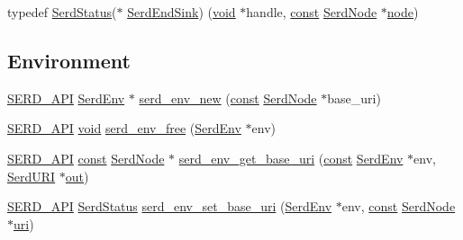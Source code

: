 \begin{DoxyCompactItemize}
\item 
typedef \hyperlink{group__serd_ga104d544e48b6282ef2447bb3ac7c330d}{Serd\+Status}($\ast$ \hyperlink{group__serd_gae67888543462e4127e6a4f6af047026b}{Serd\+End\+Sink}) (\hyperlink{sound_8c_ae35f5844602719cf66324f4de2a658b3}{void} $\ast$handle, \hyperlink{getopt1_8c_a2c212835823e3c54a8ab6d95c652660e}{const} \hyperlink{struct_serd_node}{Serd\+Node} $\ast$\hyperlink{structnode}{node})
\end{DoxyCompactItemize}
\subsection*{Environment}
\begin{DoxyCompactItemize}
\item 
\hyperlink{serd_8h_a17b2ce3a34831e5e95018430d798bd66}{S\+E\+R\+D\+\_\+\+A\+PI} \hyperlink{group__serd_gaea4226dd80abea7afa05986f195d4755}{Serd\+Env} $\ast$ \hyperlink{group__serd_ga64ffdd637dad39a2483e727125c2c285}{serd\+\_\+env\+\_\+new} (\hyperlink{getopt1_8c_a2c212835823e3c54a8ab6d95c652660e}{const} \hyperlink{struct_serd_node}{Serd\+Node} $\ast$base\+\_\+uri)
\item 
\hyperlink{serd_8h_a17b2ce3a34831e5e95018430d798bd66}{S\+E\+R\+D\+\_\+\+A\+PI} \hyperlink{sound_8c_ae35f5844602719cf66324f4de2a658b3}{void} \hyperlink{group__serd_ga09d49846b7fc7dbd9a4c0fdc1e84e915}{serd\+\_\+env\+\_\+free} (\hyperlink{group__serd_gaea4226dd80abea7afa05986f195d4755}{Serd\+Env} $\ast$env)
\item 
\hyperlink{serd_8h_a17b2ce3a34831e5e95018430d798bd66}{S\+E\+R\+D\+\_\+\+A\+PI} \hyperlink{getopt1_8c_a2c212835823e3c54a8ab6d95c652660e}{const} \hyperlink{struct_serd_node}{Serd\+Node} $\ast$ \hyperlink{group__serd_ga94b861ea65187556a473dcb668ab8667}{serd\+\_\+env\+\_\+get\+\_\+base\+\_\+uri} (\hyperlink{getopt1_8c_a2c212835823e3c54a8ab6d95c652660e}{const} \hyperlink{group__serd_gaea4226dd80abea7afa05986f195d4755}{Serd\+Env} $\ast$env, \hyperlink{struct_serd_u_r_i}{Serd\+U\+RI} $\ast$\hyperlink{latency_8c_a71fd1c281affec034757279e4f91c50b}{out})
\item 
\hyperlink{serd_8h_a17b2ce3a34831e5e95018430d798bd66}{S\+E\+R\+D\+\_\+\+A\+PI} \hyperlink{group__serd_ga104d544e48b6282ef2447bb3ac7c330d}{Serd\+Status} \hyperlink{group__serd_gaddd2dd19cd0a36ce4ea39ade113eab62}{serd\+\_\+env\+\_\+set\+\_\+base\+\_\+uri} (\hyperlink{group__serd_gaea4226dd80abea7afa05986f195d4755}{Serd\+Env} $\ast$env, \hyperlink{getopt1_8c_a2c212835823e3c54a8ab6d95c652660e}{const} \hyperlink{struct_serd_node}{Serd\+Node} $\ast$\hyperlink{lib_2expat_8h_a5a9fdd6c2606370ad12f24c078ac6585}{uri})

\end{DoxyCompactItemize}
